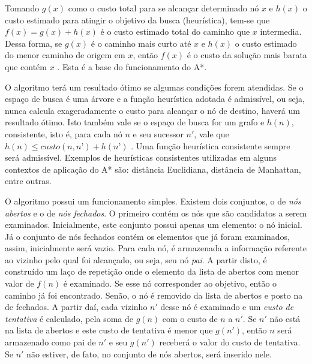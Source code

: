 \documentclass[12pt]{article}
\begin{document}
Tomando $g(x)$ como o custo total para se alcançar determinado nó $x$ e $h(x)$ o custo estimado para atingir o objetivo da busca (heurística), tem-se que $f(x) = g(x)+h(x)$ é o custo estimado total do caminho que $x$ intermedia. Dessa forma, se $g(x)$ é o caminho mais curto até $x$ e $h(x)$ o custo estimado do menor caminho de origem em $x$, então $f(x)$ é o custo da solução mais barata que contém $x$ \cite{russel:2010}. Esta é a base do funcionamento do A*.

O algoritmo terá um resultado ótimo se algumas condições forem atendidas. Se o espaço de busca é uma árvore e a função heurística adotada é admissível, ou seja, nunca calcula exageradamente o custo para alcançar o nó de destino, haverá um resultado ótimo. Isto também vale se o espaço de busca for um grafo e $h(n)$, consistente, isto é, para cada nó $n$ e seu sucessor $n'$, vale que $h(n) \leq custo(n,n’) + h(n’)$ \cite{avila:2005}. Uma função heurística consistente sempre será admissível. Exemplos de heurísticas consistentes utilizadas em alguns contextos de aplicação do A* são: distância Euclidiana, distância de Manhattan, entre outras.

O algoritmo possui um funcionamento simples. Existem dois conjuntos, o de \emph{nós abertos} e o de \emph{nós fechados}. O primeiro contém os nós que são candidatos a serem examinados. Inicialmente, este conjunto possui apenas um elemento: o nó inicial. Já o conjunto de nós fechados contém os elementos que já foram examinados, assim, inicialmente será vazio. Para cada nó, é armazenada a informação referente ao vizinho pelo qual foi alcançado, ou seja, seu nó \emph{pai}. A partir disto, é construído um laço de repetição onde o elemento da lista de abertos com menor valor de $f(n)$ é examinado. Se esse nó corresponder ao objetivo, então o caminho já foi encontrado. Senão, o nó é removido da lista de abertos e posto na de fechados. A partir daí, cada vizinho $n'$ desse nó é examinado e um \emph{custo de tentativa} é calculado, pela soma de $g(n)$ com o custo de $n$ a $n'$. Se $n'$ não está na lista de abertos e este custo de tentativa é menor que $g(n')$, então $n$ será armazenado como pai de $n'$ e seu $g(n')$ receberá o valor do custo de tentativa. Se $n'$ não estiver, de fato, no conjunto de nós abertos, será inserido nele.
\end{document}
